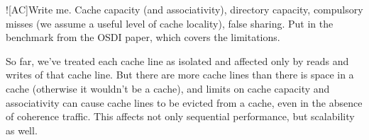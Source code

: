 \XXX![AC]{Write me.  Cache capacity (and associativity), directory
  capacity, compulsory misses (we assume a useful level of cache
  locality), false sharing.  Put in the benchmark from the OSDI paper,
  which covers the limitations.}

So far, we've treated each cache line as isolated and affected only by
reads and writes of that cache line.  But there are more cache lines
than there is space in a cache (otherwise it wouldn't be a cache), and
limits on cache capacity and associativity can cause cache lines to be
evicted from a cache, even in the absence of coherence traffic.  This
affects not only sequential performance, but scalability as well.
